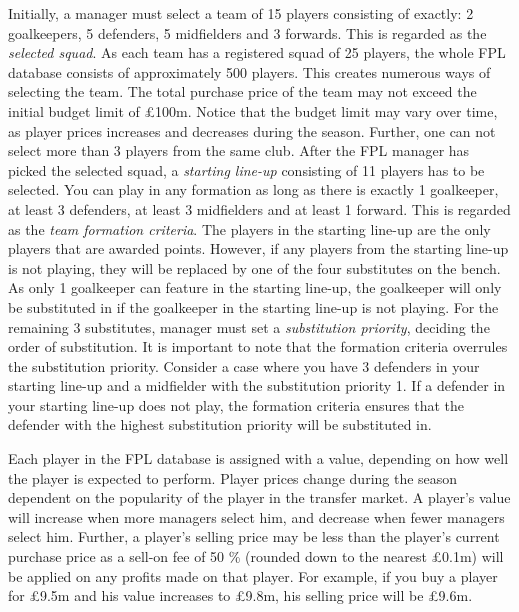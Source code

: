 \newpar

Initially, a manager must select a team of 15 players consisting of exactly: 2 goalkeepers, 5 defenders, 5 midfielders and 3 forwards. This is regarded as the \textit{selected squad}. As each team has a registered squad of 25 players, the whole FPL database consists of approximately 500 players. This creates numerous ways of selecting the team. The total purchase price of the team may not exceed the initial budget limit of \pounds 100m. Notice that the budget limit may vary over time, as player prices increases and decreases during the season. Further, one can not select more than 3 players from the same club. After the FPL manager has picked the selected squad, a \textit{starting line-up} consisting of 11 players has to be selected. You can play in any formation as long as there is exactly 1 goalkeeper, at least 3 defenders, at least 3 midfielders and at least 1 forward. This is regarded as the \textit{team formation criteria}. The players in the starting line-up are the only players that are awarded points. However, if any players from the starting line-up is not playing, they will be replaced by one of the four substitutes on the bench. As only 1 goalkeeper can feature in the starting line-up, the goalkeeper will only be substituted in if the goalkeeper in the starting line-up is not playing. For the remaining 3 substitutes, manager must set a \textit{substitution priority}, deciding the order of substitution. It is important to note that the formation criteria overrules the substitution priority. Consider a case where you have 3 defenders in your starting line-up and a midfielder with the substitution priority 1. If a defender in your starting line-up does not play, the formation criteria ensures that the defender with the highest substitution priority will be substituted in. 

\newpar

Each player in the FPL database is assigned with a value, depending on how well the player is expected to perform. Player prices change during the season dependent on the popularity of the player in the transfer market. A player's value will increase when more managers select him, and decrease when fewer managers select him. Further, a player's selling price may be less than the player's current purchase price as a sell-on fee of 50 \% (rounded down to the nearest \pounds 0.1m) will be applied on any profits made on that player. For example, if you buy a player for \pounds 9.5m and his value increases to \pounds 9.8m, his selling price will be \pounds 9.6m.

